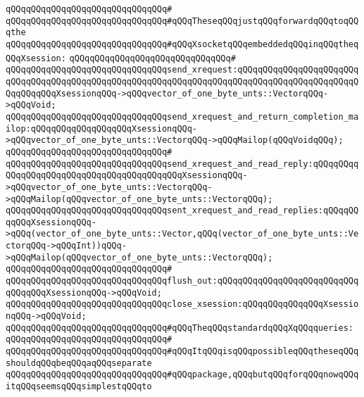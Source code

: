 \verb|qQQqqQQqqQQqqQQqqQQqqQQqqQQqqQQq#|\newline
\verb|qQQqqQQqqQQqqQQqqQQqqQQqqQQqqQQq#qQQqTheseqQQqjustqQQqforwardqQQqtoqQQqthe|\newline
\verb|qQQqqQQqqQQqqQQqqQQqqQQqqQQqqQQq#qQQqXsocketqQQqembeddedqQQqinqQQqtheqQQqXsession:|\newline
\verb|qQQqqQQqqQQqqQQqqQQqqQQqqQQqqQQq#|\newline
\verb|qQQqqQQqqQQqqQQqqQQqqQQqqQQqqQQqsend_xrequest:qQQqqQQqqQQqqQQqqQQqqQQqqQQqqQQqqQQqqQQqqQQqqQQqqQQqqQQqqQQqqQQqqQQqqQQqqQQqqQQqqQQqqQQqqQQqqQQqqQQqqQQqXsessionqQQq->qQQqvector_of_one_byte_unts::VectorqQQq->qQQqVoid;|\newline
\verb|qQQqqQQqqQQqqQQqqQQqqQQqqQQqqQQqsend_xrequest_and_return_completion_mailop:qQQqqQQqqQQqqQQqqQQqXsessionqQQq->qQQqvector_of_one_byte_unts::VectorqQQq->qQQqMailop(qQQqVoidqQQq);|\newline
\verb|qQQqqQQqqQQqqQQqqQQqqQQqqQQqqQQq#|\newline
\verb|qQQqqQQqqQQqqQQqqQQqqQQqqQQqqQQqsend_xrequest_and_read_reply:qQQqqQQqqQQqqQQqqQQqqQQqqQQqqQQqqQQqqQQqqQQqXsessionqQQq->qQQqvector_of_one_byte_unts::VectorqQQq->qQQqMailop(qQQqvector_of_one_byte_unts::VectorqQQq);|\newline
\verb|qQQqqQQqqQQqqQQqqQQqqQQqqQQqqQQqsent_xrequest_and_read_replies:qQQqqQQqqQQqXsessionqQQq->qQQq(vector_of_one_byte_unts::Vector,qQQq(vector_of_one_byte_unts::VectorqQQq->qQQqInt))qQQq->qQQqMailop(qQQqvector_of_one_byte_unts::VectorqQQq);|\newline
\verb|qQQqqQQqqQQqqQQqqQQqqQQqqQQqqQQq#|\newline
\verb|qQQqqQQqqQQqqQQqqQQqqQQqqQQqqQQqflush_out:qQQqqQQqqQQqqQQqqQQqqQQqqQQqqQQqqQQqXsessionqQQq->qQQqVoid;|\newline
\verb|qQQqqQQqqQQqqQQqqQQqqQQqqQQqqQQqclose_xsession:qQQqqQQqqQQqqQQqXsessionqQQq->qQQqVoid;|\newline
\newline
\newline
\verb|qQQqqQQqqQQqqQQqqQQqqQQqqQQqqQQq#qQQqTheqQQqstandardqQQqXqQQqqueries:|\newline
\verb|qQQqqQQqqQQqqQQqqQQqqQQqqQQqqQQq#|\newline
\verb|qQQqqQQqqQQqqQQqqQQqqQQqqQQqqQQq#qQQqItqQQqisqQQqpossibleqQQqtheseqQQqshouldqQQqbeqQQqaqQQqseparate|\newline
\verb|qQQqqQQqqQQqqQQqqQQqqQQqqQQqqQQq#qQQqpackage,qQQqbutqQQqforqQQqnowqQQqitqQQqseemsqQQqsimplestqQQqto|\newline
